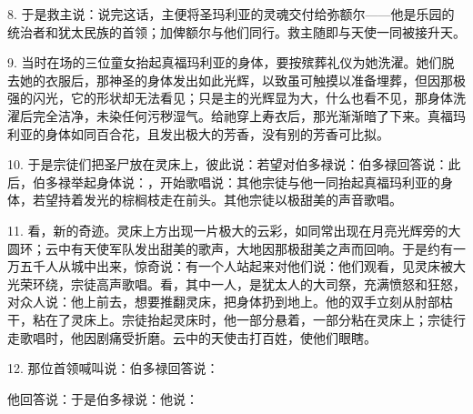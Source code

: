 8. 于是救主说：说完这话，主便将圣玛利亚的灵魂交付给弥额尔——他是乐园的统治者和犹太民族的首领；加俾额尔与他们同行。救主随即与天使一同被接升天。\par

9. 当时在场的三位童女抬起真福玛利亚的身体，要按殡葬礼仪为她洗濯。她们脱去她的衣服后，那神圣的身体发出如此光辉，以致虽可触摸以准备埋葬，但因那极强的闪光，它的形状却无法看见；只是主的光辉显为大，什么也看不见，那身体洗濯后完全洁净，未染任何污秽湿气。给祂穿上寿衣后，那光渐渐暗了下来。真福玛利亚的身体如同百合花，且发出极大的芳香，没有别的芳香可比拟。\par

10. 于是宗徒们把圣尸放在灵床上，彼此说：若望对伯多禄说：伯多禄回答说：此后，伯多禄举起身体说：，开始歌唱说：其他宗徒与他一同抬起真福玛利亚的身体，若望持着发光的棕榈枝走在前头。其他宗徒以极甜美的声音歌唱。\par

11. 看，新的奇迹。灵床上方出现一片极大的云彩，如同常出现在月亮光辉旁的大圆环；云中有天使军队发出甜美的歌声，大地因那极甜美之声而回响。于是约有一万五千人从城中出来，惊奇说：有一个人站起来对他们说：他们观看，见灵床被大光荣环绕，宗徒高声歌唱。看，其中一人，是犹太人的大司祭，充满愤怒和狂怒，对众人说：他上前去，想要推翻灵床，把身体扔到地上。他的双手立刻从肘部枯干，粘在了灵床上。宗徒抬起灵床时，他一部分悬着，一部分粘在灵床上；宗徒行走歌唱时，他因剧痛受折磨。云中的天使击打百姓，使他们眼瞎。\par

12. 那位首领喊叫说：伯多禄回答说：\par

他回答说：于是伯多禄说：他说：\par

